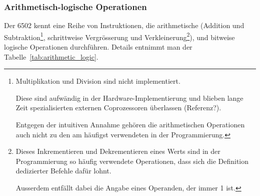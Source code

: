 \documentclass[11pt]{scrartcl}
\begin{document}
\subsubsection{Arithmetisch-logische Operationen}
\label{sec:arithmetic_logic}

Der 6502 kennt eine Reihe von Instruktionen, die arithmetische
(Addition und Subtraktion\footnote{Multiplikation und Division sind
  nicht implementiert.

  Diese sind aufwändig in der Hardware-Implementierung und blieben
  lange Zeit spezialisierten externen Coprozessoren überlassen
  (Referenz?).

  Entgegen der intuitiven Annahme gehören die arithmetischen
  Operationen auch nicht zu den am häufigst verwendeten in der
  Programmierung.}, schrittweise Vergrösserung und
Verkleinerung\footnote{Dieses Inkrementieren und Dekrementieren eines Werts
  sind in der Programmierung so häufig verwendete Operationen, dass
  sich die Definition dedizierter Befehle dafür lohnt.

  Ausserdem entfällt dabei die Angabe eines Operanden, der immer 1
  ist.}),
und bitweise logische Operationen durchführen. Details
entnimmt man der Tabelle~\ref{tab:arithmetic_logic}.
\end{document}
